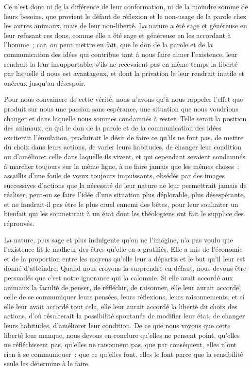 \documentclass[french,twoside]{book} %
\begin{document}
Ce n’est donc ni de la différence de leur conformation, ni de la moindre somme de leurs besoins, que provient le défaut de réflexion et le non-usage de la parole chez les autres animaux, mais de leur non-liberté. La nature a été sage et généreuse en leur refusant ces dons, comme elle a été sage et généreuse en les accordant à l’homme ; car, on peut mettre en fait, que le don de la parole et de la communication des idées qui contribue tant à nous faire aimer l’existence, leur rendrait la leur insupportable, s’ils ne recevaient pas en même temps la liberté par laquelle il nous est avantageux, et dont la privation le leur rendrait inutile et onéreux jusqu’au désespoir.\par
Pour nous convaincre de cette vérité, nous n’avons qu’à nous rappeler l’effet que produit sur nous une passion sans espérance, une situation que nous voudrions changer et dans laquelle nous sommes condamnés à rester. Telle serait la position des animaux, en qui le don de la parole et de la communication des idées exciterait l’émulation, produirait le désir de faire ce qu’ils ne font pas, de mettre du choix dans leurs actions, de varier leurs habitudes, de changer leur condition ou d’améliorer celle dans laquelle ils vivent, et qui cependant seraient condamnés à marcher toujours sur la même ligne, à ne faire jamais que les mêmes choses ; assaillis d’une foule de vœux toujours impuissants, obsédés par des images successives d’actions que la nécessité de leur nature ne leur permettrait jamais de réaliser, peut-on se faire l’idée d’une situation plus déplorable, plus désespérante, et ne faudrait-il pas être le plus cruel ennemi des bêtes, pour leur souhaiter un bienfait qui les soumettrait à un état dont les théologiens ont fait le supplice des réprouvés.\par
La nature, plus sage et plus indulgente qu’on ne l’imagine, n’a pas voulu que l’existence fit le malheur des êtres qu’elle en a gratifiés. Elle a mis de l’économie et de la proportion entre les moyens qu’elle leur a départis et le but qu’il leur est donné d’atteindre. Quand nous croyons la surprendre en défaut, nous devons être persuadés que c’est notre ignorance qui la calomnie. Si elle avait accordé aux animaux la faculté de penser, de réfléchir, de raisonner, elle leur aurait accordé celle de se communiquer leurs pensées, leurs réflexions, leurs raisonnements, et si elle leur avait accordé tout cela, elle leur aurait accordé la liberté du choix des actions, d’où résulterait la possibilité spontanée de modifier leur état, de changer leurs habitudes, d’améliorer leur condition. De ce que nous voyons que cette liberté leur manque, nous devons en conclure qu’elles ne pensent point, qu’elles ne réfléchissent pas, qu’elles ne raisonnent pas, que par conséquent, elles n’ont rien à se communiquer ; que ce qu’elles font, elles le font parce que la sensibilité seule les détermine à le faire.\par
\end{document}
